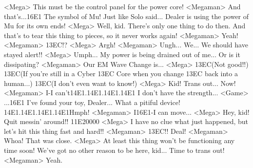 <Mega> This must be the control panel for the power core! 
<Megaman> And that's...{16}{E1} The symbol of Mu! 
Just like Solo said... 
Dealer is using the power of Mu for its own ends! 
<Mega> Well, kid. There's only one thing to do then. 
And that's to tear this thing to pieces, so it never works again! 
<Megaman> Yeah! 
<Megaman> {13}{EC}!? 
<Mega> Argh! 
<Megaman> Ungh... 
We... We should have stayed alert!! 
<Mega> Umph... 
My power is being drained out of me... 
Or is it dissipating? 
<Megaman> Our EM Wave Change is... 
<Mega> {13}{EC}(Not good!!) 
{13}{EC}(If you're still in a Cyber {13}{EC} Core when you change {13}{EC} back into a human...) 
{13}{EC}(I don't even want to know!) 
<Mega> Kid! Trans out... Now! 
<Megaman> I-I can't{14}{E1}.{14}{E1}.{14}{E1}.{14}{E1} 
I don't have the strength... 
<Game> ...{16}{E1} I've found your toy, Dealer... 
What a pitiful device! 
{14}{E1}.{14}{E1}.{14}{E1}.{14}{E1}Hmph! 
<Megaman> I{16}{E1}-I can move... 
<Mega> Hey, kid! Quit messin' around!! 
{11}{E2}{00}{00} 
<Mega> I have no clue what just happened, but let's hit this thing fast and hard!! 
<Megaman> {13}{EC}!! 
Deal! 
<Megaman> Whoa! 
That was close. 
<Mega> At least this thing won't be functioning any time soon! 
We've got no other reason to be here, kid... Time to trans out! 
<Megaman> Yeah. 
